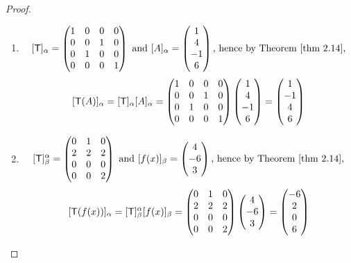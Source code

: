 \begin{proof} \ 
\begin{enumerate}
\item
\[
    [\T]_{\alpha}
    = \begin{pmatrix}
        1 & 0 & 0 & 0 \\
        0 & 0 & 1 & 0 \\
        0 & 1 & 0 & 0 \\
        0 & 0 & 0 & 1
    \end{pmatrix}
    \text{ and }
    [A]_{\alpha} = \begin{pmatrix} 1 \\ 4 \\ -1 \\ 6 \end{pmatrix}
    \text{, hence by \THM{2.14},}
\]
\[
    [\textsf{T}(A)]_{\alpha} = [\textsf{T}]_{\alpha} [A]_{\alpha}
    = \begin{pmatrix}
        1 & 0 & 0 & 0 \\
        0 & 0 & 1 & 0 \\
        0 & 1 & 0 & 0 \\
        0 & 0 & 0 & 1
    \end{pmatrix}
    \begin{pmatrix} 1 \\ 4 \\ -1 \\ 6 \end{pmatrix}
    = \begin{pmatrix} 1 \\ -1 \\ 4 \\ 6 \end{pmatrix}
\]

\item
\[
    [\T]_{\beta}^{\alpha} = \begin{pmatrix} 0 & 1 & 0 \\ 2 & 2 & 2 \\ 0 & 0 & 0 \\ 0 & 0 & 2 \end{pmatrix}
    \text{ and  }
    [f(x)]_{\beta} = \begin{pmatrix} 4 \\ -6 \\ 3 \end{pmatrix}
    \text{, hence by \THM{2.14},}
\]
\[
    [\textsf{T}(f(x))]_{\alpha} = [\textsf{T}]_{\beta}^{\alpha} [f(x)]_{\beta}
    = \begin{pmatrix} 0 & 1 & 0 \\ 2 & 2 & 2 \\ 0 & 0 & 0 \\ 0 & 0 & 2 \end{pmatrix}
    \begin{pmatrix} 4 \\ -6 \\ 3 \end{pmatrix}
    = \begin{pmatrix} -6 \\ 2 \\ 0 \\ 6 \end{pmatrix}
\]


\end{enumerate}
\end{proof}
